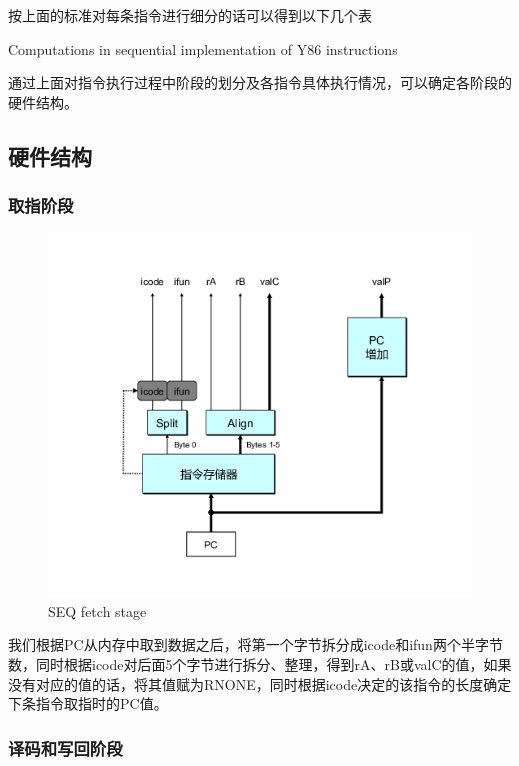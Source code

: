 按上面的标准对每条指令进行细分的话可以得到以下几个表

Computations in sequential implementation of Y86 instructions

通过上面对指令执行过程中阶段的划分及各指令具体执行情况，可以确定各阶段的硬件结构。

\subsection{硬件结构}\label{ux786cux4ef6ux7ed3ux6784}

\subsubsection{取指阶段}\label{ux53d6ux6307ux9636ux6bb5}

\begin{figure}[htbp]
\centering
\includegraphics{img/seq-fetch.png}
\caption{SEQ fetch stage}
\end{figure}

我们根据PC从内存中取到数据之后，将第一个字节拆分成icode和ifun两个半字节数，同时根据icode对后面5个字节进行拆分、整理，得到rA、rB或valC的值，如果没有对应的值的话，将其值赋为RNONE，同时根据icode决定的该指令的长度确定下条指令取指时的PC值。

\subsubsection{译码和写回阶段}\label{ux8bd1ux7801ux548cux5199ux56deux9636ux6bb5}

